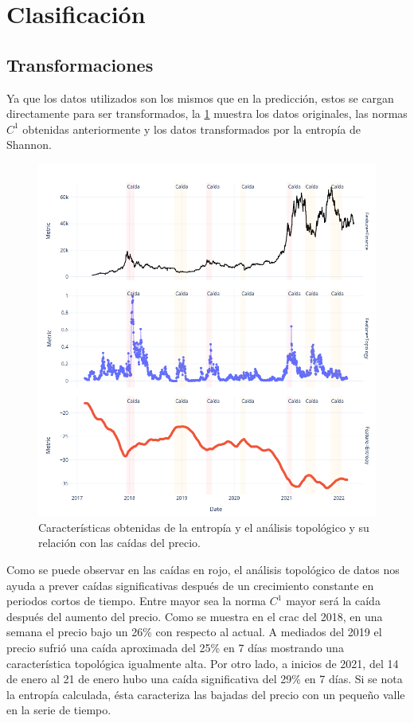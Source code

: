 \section{Clasificación}
\label{res_clasificacion}

\subsection{Transformaciones}
Ya que los datos utilizados son los mismos que en la predicción, estos se cargan directamente para ser transformados, la \cref{fig27} muestra los datos originales, las normas $C^1$ obtenidas anteriormente y los datos transformados por la entropía de Shannon. 

\begin{figure}[h!]
	\centering
	\includegraphics[scale=0.55]{Chapter5/clasifica_transf.png}
	\caption{Características obtenidas de la entropía y el análisis topológico y su relación con las caídas del precio.}
	\label{fig27}
\end{figure}
\vspace{1cm}
Como se puede observar en las caídas en rojo, el análisis topológico de datos nos ayuda a prever caídas significativas después de un crecimiento constante en periodos cortos de tiempo. Entre mayor sea la norma $C^1$ mayor será la caída después del aumento del precio. Como se muestra en el crac del 2018, en una semana el precio bajo un 26\% con respecto al actual. A mediados del 2019 el precio sufrió una caída aproximada del 25\% en 7 días mostrando una característica topológica igualmente alta. Por otro lado, a inicios de 2021, del 14 de enero al 21 de enero hubo una caída significativa del 29\% en 7 días. Si se nota la entropía calculada, ésta caracteriza las bajadas del precio con un pequeño valle en la serie de tiempo.

